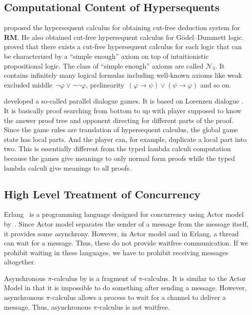 \documentclass[doctor]{iscs-thesis}
\begin{document}
\subsection{Computational Content of Hypersequents}

\citet{RM} proposed the hypersequent calculus for obtaining
cut-free deduction system for \textbf{RM}.
He also obtained cut-free hypersequent calculus for G\"odel--Dummett
logic.
\citet*{agt08} proved that there exists a cut-free hypersequent calculus
for each logic that can be characterized by a ``simple enough'' axiom on
top of intuitionistic propositional logic.  The class of ``simple
enough'' axioms are called $\mathcal N_3$.  It contains infinitely many
logical formulas including well-known axioms like weak excluded
middle~$\neg\varphi\vee\neg\neg\varphi$,
prelinearity~$(\varphi\rightarrow\psi)\vee(\psi\rightarrow\varphi)$ and so on.

\citet{parallel} developed a so-called parallel dialogue games.  It is
based on Lorenzen dialogue .  It is basically proof searching from
bottom to up with player supposed
to know the answer proof tree and opponent directing for different parts
of the proof.  Since the game rules are translation of hypersequent
calculus, the global game state has local parts.  And the player can,
for example, duplicate a local part into two.  This is essentially
different from the typed lambda calculi computation because the games
give meanings to only normal form proofs while the typed lambda calculi
give meanings to all proofs.

\subsection{High Level Treatment of Concurrency}

Erlang~\citep{erlang} is a programming language designed for concurrency
using Actor
model by~\citet{actor}.
Since Actor model separates the sender of a message from the message
itself, it provides some asynchrony.  However, in Actor model and in
Erlang, a thread can wait for a message.  Thus, these do not provide
waitfree communication.  If we prohibit waiting in these languages,
we have to prohibit
receiving messages altogether.


Asynchronous $\pi$-calculus by \citet{api} is a fragment of
$\pi$-calculus.  It is
similar to the Actor Model in that it is impossible to do something
after sending a message.  However, asynchronous $\pi$-calculus
allows a process to wait for a channel to deliver a message.  Thus,
asynchronous $\pi$-calculus is not waitfree.
\end{document}

